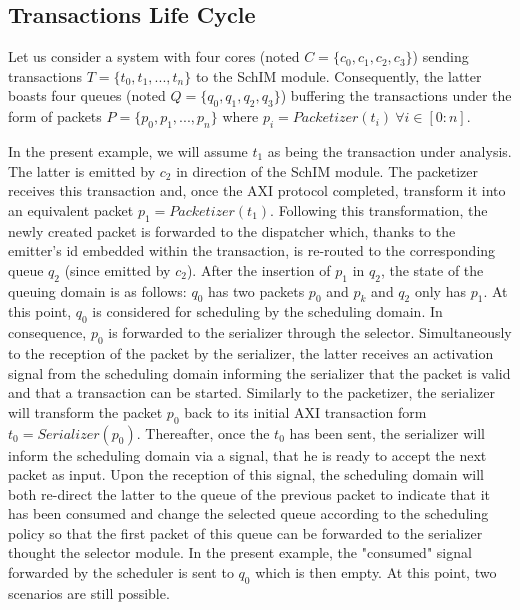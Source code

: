     \subsection{Transactions Life Cycle}
    Let us consider a system with four cores (noted $C = \{c_{0}, c_{1}, c_{2}, c_{3}\}$) sending transactions $T = \{t_{0}, t_{1}, ..., t_{n}\}$ to the SchIM module.
    Consequently, the latter boasts four queues (noted $Q = \{q_{0}, q_{1}, q_{2}, q_{3}\}$) buffering the transactions under the form of packets $P = \{p_{0}, p_{1}, ..., p_{n}\}$ where $p_{i} = Packetizer(t_{i})~\forall i \in [0 : n]$.

    In the present example, we will assume $t_{1}$ as being the transaction under analysis.
    The latter is emitted by $c_{2}$ in direction of the SchIM module.
    The packetizer receives this transaction and, once the AXI protocol completed, transform it into an equivalent packet $p_{1} = Packetizer(t_{1})$.
    Following this transformation, the newly created packet is forwarded to the dispatcher which, thanks to the emitter's id embedded within the transaction, is re-routed to the corresponding queue $q_{2}$ (since emitted by $c_{2}$).
    After the insertion of $p_{1}$ in $q_{2}$, the state of the queuing domain is as follows: $q_{0}$ has two packets $p_{0}$ and $p_{k}$ and $q_{2}$ only has $p_{1}$.
    At this point, $q_{0}$ is considered for scheduling by the scheduling domain.
    In consequence, $p_{0}$ is forwarded to the serializer through the selector.
    Simultaneously to the reception of the packet by the serializer, the latter receives an activation signal from the scheduling domain informing the serializer that the packet is valid and that a transaction can be started.
    Similarly to the packetizer, the serializer will transform the packet $p_{0}$ back to its initial AXI transaction form $t_{0} = Serializer(p_{0})$.
    Thereafter, once the $t_{0}$ has been sent, the serializer will inform the scheduling domain via a signal, that he is ready to accept the next packet as input.
    Upon the reception of this signal, the scheduling domain will both re-direct the latter to the queue of the previous packet to indicate that it has been consumed and change the selected queue according to the scheduling policy so that the first packet of this queue can be forwarded to the serializer thought the selector module.
    In the present example, the "consumed" signal forwarded by the scheduler is sent to $q_{0}$ which is then empty.
    At this point, two scenarios are still possible.
